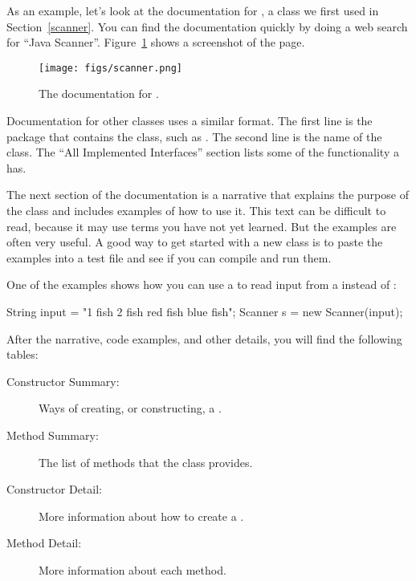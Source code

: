 

As an example, let's look at the documentation for , a class we first used in Section~\ref{scanner}.
You can find the documentation quickly by doing a web search for ``Java Scanner''.
Figure~\ref{fig.scanner} shows a screenshot of the page.

\begin{figure}[!ht]
\begin{center}
\texttt{[image: figs/scanner.png]}
\caption{The documentation for .}
\label{fig.scanner}
\end{center}
\end{figure}

Documentation for other classes uses a similar format.
The first line is the package that contains the class, such as .
The second line is the name of the class.
The ``All Implemented Interfaces'' section lists some of the functionality a  has.


The next section of the documentation is a narrative that explains the purpose of the class and includes examples of how to use it.
This text can be difficult to read, because it may use terms you have not yet learned.
But the examples are often very useful.
A good way to get started with a new class is to paste the examples into a test file and see if you can compile and run them.

One of the examples shows how you can use a  to read input from a  instead of :

\begin{code}
String input = "1 fish 2 fish red fish blue fish";
Scanner s = new Scanner(input);
\end{code}

After the narrative, code examples, and other details, you will find the following tables:

\begin{description}

\item[Constructor Summary:]
Ways of creating, or constructing, a .

\item[Method Summary:]
The list of methods that the  class provides.

\item[Constructor Detail:]
More information about how to create a .

\item[Method Detail:]
More information about each method.

\end{description}


